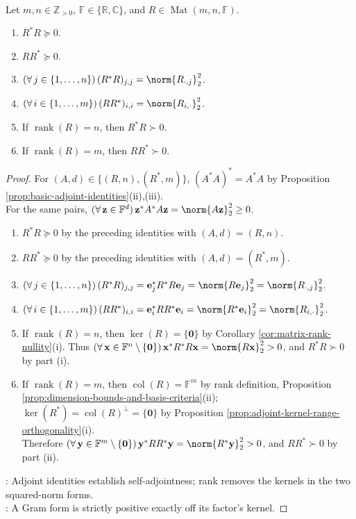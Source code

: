 \begin{proposition} \label{prop:rectangular-gram-products-are-psd} \\
Let $m,n\in\mathbb{Z}_{>0}$, $\mathbb{F}\in\{\mathbb{R},\mathbb{C}\}$, and $R\in\operatorname{Mat}(m,n,\mathbb{F})$.
\begin{enumerate}[label=(\roman*)]
\setlength{\itemsep}{0pt}
\item $R^*R\succeq0$.
\item $RR^*\succeq0$.
\item $(\forall\,j\in\{1,\ldots,n\})\,(R^*R)_{j,j}=\norm{R_{\cdot,j}}_2^2$.
\item $(\forall\,i\in\{1,\ldots,m\})\,(RR^*)_{i,i}=\norm{R_{i,\cdot}}_2^2$.
\item If $\operatorname{rank}(R)=n$, then $R^*R\succ0$.
\item If $\operatorname{rank}(R)=m$, then $RR^*\succ0$.
\end{enumerate}
\begin{proof}
For $(A,d)\in\{(R,n),(R^*,m)\}$, $(A^*A)^*=A^*A$ by Proposition \ref{prop:basic-adjoint-identities}(ii),(iii).\\
For the same pairs, $(\forall\,\mathbf{z}\in\mathbb{F}^d)\,\mathbf{z}^*A^*A\mathbf{z}=\norm{A\mathbf{z}}_2^2\geq0$.
\begin{enumerate}[label=(\roman*)]
\setlength{\itemsep}{0pt}
\item $R^*R\succeq0$ by the preceding identities with $(A,d)=(R,n)$.
\item $RR^*\succeq0$ by the preceding identities with $(A,d)=(R^*,m)$.
\item $(\forall\,j\in\{1,\ldots,n\})\,(R^*R)_{j,j}=\mathbf{e}_j^*R^*R\mathbf{e}_j=\norm{R\mathbf{e}_j}_2^2=\norm{R_{\cdot,j}}_2^2$.
\item $(\forall\,i\in\{1,\ldots,m\})\,(RR^*)_{i,i}=\mathbf{e}_i^*RR^*\mathbf{e}_i=\norm{R^*\mathbf{e}_i}_2^2=\norm{R_{i,\cdot}}_2^2$.
\item If $\operatorname{rank}(R)=n$, then $\ker(R)=\{\mathbf{0}\}$ by Corollary \ref{cor:matrix-rank-nullity}(i). Thus $(\forall\,\mathbf{x}\in\mathbb{F}^n\setminus\{\mathbf{0}\})\,\mathbf{x}^*R^*R\mathbf{x}=\norm{R\mathbf{x}}_2^2>0$, and $R^*R\succ0$ by part (i).
\item If $\operatorname{rank}(R)=m$, then $\operatorname{col}(R)=\mathbb{F}^m$ by rank definition, Proposition \ref{prop:dimension-bounds-and-basis-criteria}(ii); $\ker(R^*)=\operatorname{col}(R)^\perp=\{\mathbf{0}\}$ by Proposition \ref{prop:adjoint-kernel-range-orthogonality}(i).\\
Therefore $(\forall\,\mathbf{y}\in\mathbb{F}^m\setminus\{\mathbf{0}\})\,\mathbf{y}^*RR^*\mathbf{y}=\norm{R^*\mathbf{y}}_2^2>0$, and $RR^*\succ0$ by part (ii).
\end{enumerate}
: Adjoint identities establish self-adjointness; rank removes the kernels in the two squared-norm forms.\\
: A Gram form is strictly positive exactly off its factor's kernel.
\end{proof}
\end{proposition}

